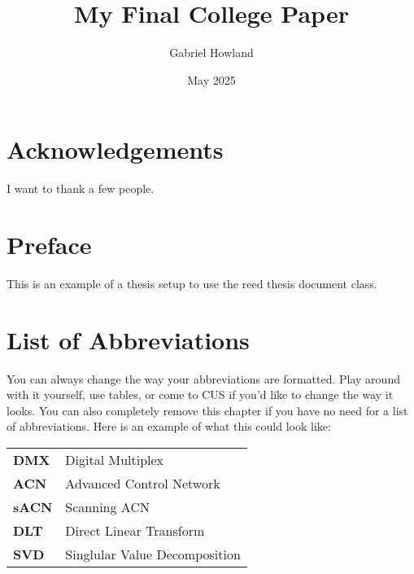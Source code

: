 \documentclass[12pt,twoside]{reedthesis}
\title{My Final College Paper}
\author{Gabriel Howland}
\date{May 2025}
\begin{document}
  \maketitle
  \frontmatter %
  \pagestyle{empty} %

    \chapter*{Acknowledgements}
	I want to thank a few people.

    \chapter*{Preface}
	This is an example of a thesis setup to use the reed thesis document class.
	
	

    \chapter*{List of Abbreviations}
		You can always change the way your abbreviations are formatted. Play around with it yourself, use tables, or come to CUS if you'd like to change the way it looks. You can also completely remove this chapter if you have no need for a list of abbreviations. Here is an example of what this could look like:

	\begin{table}[h]
	\centering %
	\begin{tabular}{ll}
		\textbf{DMX}  	&  Digital Multiplex \\
		\textbf{ACN}		&  Advanced Control Network\\
		\textbf{sACN}  	&  Scanning ACN\\
		\textbf{DLT} 	&  Direct Linear Transform\\
		\textbf{SVD}		&  Singlular Value Decomposition\\
	\end{tabular}
	\end{table}
	

    \tableofcontents
    \listoffigures
\end{document}
